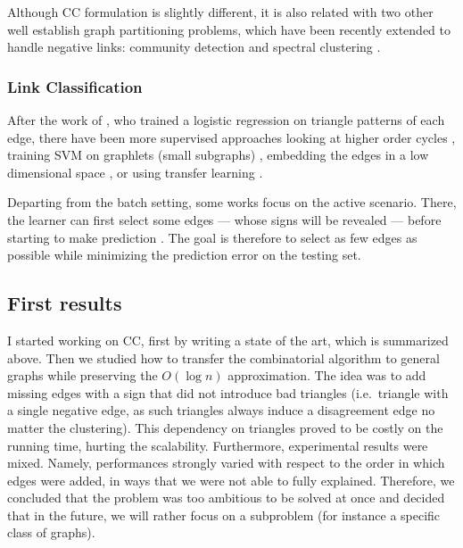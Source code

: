 Although CC formulation is slightly different, it is also related with two
other well establish graph partitioning problems, which have been recently
extended to handle negative links: community detection
\autocites{Yang2007}{Traag2009}{Amelio2013}{Chen14} and spectral clustering
\autocites{Luca10}{Gallier15}.

\subsubsection{Link Classification}\label{link-classification}

After the work of \textcite{Leskovec2010}, who trained a logistic regression on
triangle patterns of each edge, there have been more supervised approaches
looking at higher order cycles \autocite{LowRankCompletion14}, training SVM on
graphlets (small subgraphs) \autocite{Papaoikonomou2014}, embedding the edges
in a low dimensional space \autocite{Qian2014}, or using transfer learning
\autocite{SNTransfer13}.

Departing from the batch setting, some works focus on the active scenario.
There, the learner can first select some edges --- whose signs will be revealed
--- before starting to make prediction \autocites{Cesa-Bianchi2012a}%
{Cesa-Bianchi2013}. The goal is therefore to select as few edges as possible
while minimizing the prediction error on the testing set.

\subsection{First results}\label{first-results}

I started working on CC, first by writing a state of the art, which is
summarized above. Then we studied how to transfer the combinatorial algorithm
\kwik{} to general graphs while preserving the $O(\log n)$ approximation. The
idea was to add missing edges with a sign that did not introduce bad triangles
(i.e.~triangle with a single negative edge, as such triangles always induce a
disagreement edge no matter the clustering). This dependency on triangles
proved to be costly on the running time, hurting the scalability. Furthermore,
experimental results were mixed. Namely, performances strongly varied with
respect to the order in which edges were added, in ways that we were not able
to fully explained. Therefore, we concluded that the problem was too ambitious
to be solved at once and decided that in the future, we will rather focus on a
subproblem (for instance a specific class of graphs).

